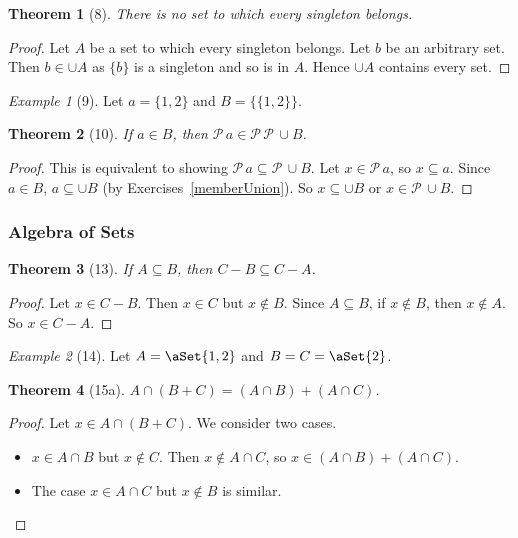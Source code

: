\documentclass[12pt]{article}
\theoremstyle{plain}
\newtheorem*{exthm}{Theorem}
\theoremstyle{remark}
\newtheorem*{eg}{Example}
\theoremstyle{definition}
\theoremstyle{remark}
\newcommand{\powerset}{\mathscr{P}\,}
\DeclarePairedDelimiter\aSet\{\}
\begin{document}
\begin{exthm}[8]
  There is no set to which every singleton belongs.
\end{exthm}
\begin{proof}
  Let $A$ be a set to which every singleton belongs. Let $b$ be an arbitrary set. Then $b \in \cup A$ as $\{b\}$ is a singleton and so is in $A$. Hence $\cup A$ contains every set.
\end{proof}

\begin{eg}[9]
  Let $a = \{1,2\}$ and $B = \{\{1,2\}\}$.
\end{eg}

\begin{exthm}[10]
  If $a \in B$, then $\powerset a \in \powerset \powerset \cup B$.
\end{exthm}
\begin{proof}
  This is equivalent to showing $\powerset a \subseteq \powerset \cup B$. Let $x \in \powerset a$, so $x \subseteq a$. Since $a \in B$, $a \subseteq \cup B$ (by Exercises~\ref{memberUnion}). So $x \subseteq \cup B$ or $x \in \powerset \cup B$.
\end{proof}

\subsubsection{Algebra of Sets}
\begin{exthm}[13]
  If $A \subseteq B$, then $C - B \subseteq C - A$.
\end{exthm}
\begin{proof}
  Let $x \in C - B$. Then $x \in C$ but $x \not\in B$. Since $A \subseteq B$, if $x \not\in B$, then $x \not\in A$. So $x \in C - A$.
\end{proof}

\begin{eg}[14]
  Let $A = \aSet{1,2}$ and $B = C = \aSet{2}$.
\end{eg}

\begin{exthm}[15a]
  $A \cap (B + C) = (A \cap B) + (A \cap C)$.
\end{exthm}
\begin{proof}
  Let $x \in A \cap (B + C)$. We consider two cases.
  \begin{itemize}
    \item $x \in A \cap B$ but $x \not\in C$. Then $x \not\in A \cap C$, so $x \in (A \cap B) + (A \cap C)$.
    \item The case $x \in A \cap C$ but $x \not\in B$ is similar.
  \end{itemize}
\end{proof}
\end{document}
